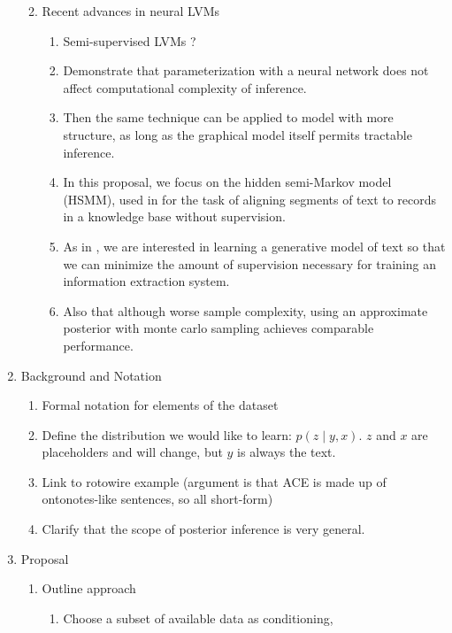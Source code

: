 \documentclass[12pt]{article}
\begin{document}
\begin{enumerate}
\begin{enumerate}
\begin{enumerate}
        \end{enumerate}
    \item Recent advances in neural LVMs
        \begin{enumerate}
        \item Semi-supervised LVMs \citet{kingma2014ssvae}?
        \item Demonstrate that parameterization with a neural network does not affect computational
            complexity of inference.
        \item Then the same technique can be applied to model with more structure,
            as long as the graphical model itself permits tractable inference.
        \item In this proposal, we focus on the hidden semi-Markov model (HSMM),
            used in \citet{liang2009semalign} for the task of aligning segments of text to
            records in a knowledge base without supervision. 
        \item As in \citet{liang2009semalign}, we are interested in learning a generative model of text so that
            we can minimize the amount of supervision necessary for training an
            information extraction system.
        \item Also that although worse sample complexity, using an approximate posterior
            with monte carlo sampling achieves comparable performance.
        \end{enumerate}
    \end{enumerate}
\item Background and Notation
    \begin{enumerate}
    \item Formal notation for elements of the dataset
    \item Define the distribution we would like to learn: $p(z\mid y, x)$.
        $z$ and $x$ are placeholders and will change, but $y$ is always the text.
    \item Link to rotowire example
        (argument is that ACE is made up of ontonotes-like sentences, so all short-form)
    \item Clarify that the scope of posterior inference is very general.
    \end{enumerate}
\item Proposal
    \begin{enumerate}
    \item Outline approach
        \begin{enumerate}
        \item Choose a subset of available data as conditioning,

\end{enumerate}
\end{enumerate}
\end{enumerate}
\end{document}
